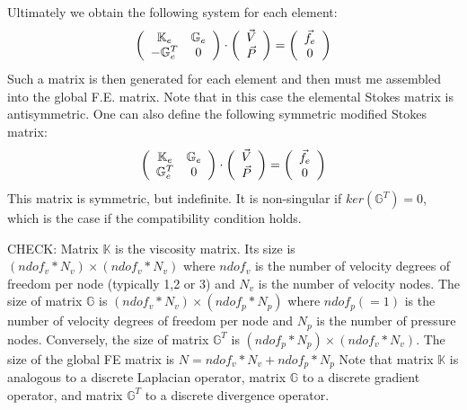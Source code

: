 Ultimately we obtain the following system for each element:
\[
\left(
\begin{array}{cc}
{\mathbb{K}}_e & {\mathbb{G}}_e \\
-{\mathbb{G}}_e^T & 0
\end{array}
\right)
\cdot
\left(
\begin{array}{c}
\vec{V} \\ \vec{P} 
\end{array}
\right)
=
\left(
\begin{array}{c}
\vec{f}_e \\ 0 
\end{array}
\right)
\]
Such a matrix is then generated for each element and then must me assembled into the 
global F.E. matrix. 
Note that in this case the elemental Stokes matrix is antisymmetric. 
One can also define the following symmetric modified Stokes matrix:
\begin{equation}
\left(
\begin{array}{cc}
{\mathbb{K}}_e & {\mathbb{G}}_e \\
{\mathbb{G}}_e^T & 0
\end{array}
\right)
\cdot
\left(
\begin{array}{c}
\vec{V} \\ \vec{P} 
\end{array}
\right)
=
\left(
\begin{array}{c}
\vec{f}_e \\ 0 
\end{array}
\right)
\label{eq:KGGT}
\end{equation}
This matrix is symmetric, but indefinite. It is non-singular 
if $ker(\mathbb{G}^T)={ 0}$, which is the case if 
the compatibility condition holds.





{\color{red} CHECK:}
Matrix $\mathbb{K}$ is the viscosity matrix. Its size is $(ndof_v * N_v)\times (ndof_v * N_v)$ where $ndof_v$ is the number of velocity degrees of freedom per node (typically 1,2 or 3) and $N_v$ is the number of velocity nodes.
The size of matrix $\mathbb{G}$ is $(ndof_v * N_v)\times (ndof_p * N_p)$ where $ndof_p(=1)$  is the number of velocity degrees of freedom per node and $N_p$ is the number of pressure nodes. Conversely, the size of matrix $\mathbb{G}^T$ is $(ndof_p * N_p)\times (ndof_v * N_v)$.
The size of the global FE matrix is $N = ndof_v * N_v + ndof_p * N_p$
Note that matrix $\mathbb{K}$ is analogous to a discrete Laplacian operator, matrix $\mathbb{G}$ to a discrete gradient operator, and matrix $\mathbb{G}^T$ to a discrete divergence operator.





